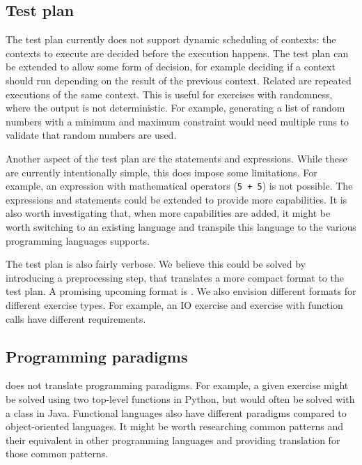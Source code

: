 \documentclass[5p,number]{elsarticle}
\begin{document}
    \subsection{Test plan}\label{subsec:test-plan}

    The test plan currently does not support dynamic scheduling of contexts: the contexts to execute are decided before the execution happens.
    The test plan can be extended to allow some form of decision, for example deciding if a context should run depending on the result of the previous context.
    Related are repeated executions of the same context.
    This is useful for exercises with randomness, where the output is not deterministic.
    For example, generating a list of random numbers with a minimum and maximum constraint would need multiple runs to validate that random numbers are used.
    
    Another aspect of the test plan are the statements and expressions.
    While these are currently intentionally simple, this does impose some limitations.
    For example, an expression with mathematical operators (\texttt{5 + 5}) is not possible.
    The expressions and statements could be extended to provide more capabilities.
    It is also worth investigating that, when more capabilities are added, it might be worth switching to an existing language and transpile this language to the various programming languages \tested{} supports.
    
    The test plan is also fairly verbose.
    We believe this could be solved by introducing a preprocessing step, that translates a more compact format to the test plan.
    A promising upcoming format is  \cite{peml}.
    We also envision different formats for different exercise types.
    For example, an IO exercise and exercise with function calls have different requirements.
    
    \subsection{Programming paradigms}\label{subsec:programming-paradigms}

    \tested{} does not translate programming paradigms.
    For example, a given exercise might be solved using two top-level functions in Python, but would often be solved with a class in Java.
    Functional languages also have different paradigms compared to object-oriented languages.
    It might be worth researching common patterns and their equivalent in other programming languages and providing translation for those common patterns.
    
\end{document}
